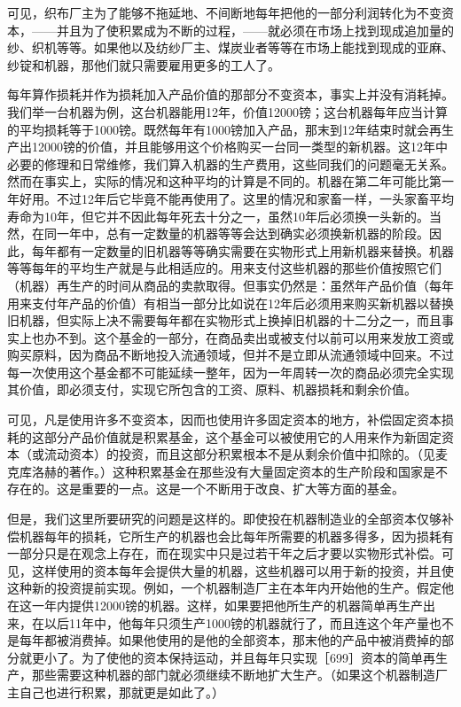可见，织布厂主为了能够不拖延地、不间断地每年把他的一部分利润转化为不变资本，——并且为了使积累成为不断的过程，——就必须在市场上找到现成追加量的纱、织机等等。如果他以及纺纱厂主、煤炭业者等等在市场上能找到现成的亚麻、纱锭和机器，那他们就只需要雇用更多的工人了。

每年算作损耗并作为损耗加入产品价值的那部分不变资本，事实上并没有消耗掉。我们举一台机器为例，这台机器能用12年，价值12000镑；这台机器每年应当计算的平均损耗等于1000镑。既然每年有1000镑加入产品，那末到12年结束时就会再生产出12000镑的价值，并且能够用这个价格购买一台同一类型的新机器。这12年中必要的修理和日常维修，我们算入机器的生产费用，这些同我们的问题毫无关系。然而在事实上，实际的情况和这种平均的计算是不同的。机器在第二年可能比第一年好用。不过12年后它毕竟不能再使用了。这里的情况和家畜一样，一头家畜平均寿命为10年，但它并不因此每年死去十分之一，虽然10年后必须换一头新的。当然，在同一年中，总有一定数量的机器等等会达到确实必须换新机器的阶段。因此，每年都有一定数量的旧机器等等确实需要在实物形式上用新机器来替换。机器等等每年的平均生产就是与此相适应的。用来支付这些机器的那些价值按照它们（机器）再生产的时间从商品的卖款取得。但事实仍然是：虽然年产品价值（每年用来支付年产品的价值）有相当一部分比如说在12年后必须用来购买新机器以替换旧机器，但实际上决不需要每年都在实物形式上换掉旧机器的十二分之一，而且事实上也办不到。这个基金的一部分，在商品卖出或被支付以前可以用来发放工资或购买原料，因为商品不断地投入流通领域，但并不是立即从流通领域中回来。不过每一次使用这个基金都不可能延续一整年，因为一年周转一次的商品必须完全实现其价值，即必须支付，实现它所包含的工资、原料、机器损耗和剩余价值。

可见，凡是使用许多不变资本，因而也使用许多固定资本的地方，补偿固定资本损耗的这部分产品价值就是积累基金，这个基金可以被使用它的人用来作为新固定资本（或流动资本）的投资，而且这部分积累根本不是从剩余价值中扣除的。（见麦克库洛赫的著作。）这种积累基金在那些没有大量固定资本的生产阶段和国家是不存在的。这是重要的一点。这是一个不断用于改良、扩大等方面的基金。


但是，我们这里所要研究的问题是这样的。即使投在机器制造业的全部资本仅够补偿机器每年的损耗，它所生产的机器也会比每年所需要的机器多得多，因为损耗有一部分只是在观念上存在，而在现实中只是过若干年之后才要以实物形式补偿。可见，这样使用的资本每年会提供大量的机器，这些机器可以用于新的投资，并且使这种新的投资提前实现。例如，一个机器制造厂主在本年内开始他的生产。假定他在这一年内提供12000镑的机器。这样，如果要把他所生产的机器简单再生产出来，在以后11年中，他每年只须生产1000镑的机器就行了，而且连这个年产量也不是每年都被消费掉。如果他使用的是他的全部资本，那末他的产品中被消费掉的部分就更小了。为了使他的资本保持运动，并且每年只实现［699］资本的简单再生产，那些需要这种机器的部门就必须继续不断地扩大生产。（如果这个机器制造厂主自己也进行积累，那就更是如此了。）

